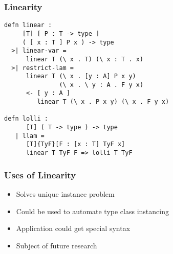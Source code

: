 \begin{frame}[fragile]
\frametitle{Linearity}
\begin{lstlisting}
defn linear : 
     [T] [ P : T -> type ] 
     ( [ x : T ] P x ) -> type
  >| linear-var = 
      linear T (\ x . T) (\ x : T . x)
  >| restrict-lam = 
      linear T (\ x . [y : A] P x y) 
               (\ x . \ y : A . F y x)
      <- [ y : A ] 
         linear T (\ x . P x y) (\ x . F y x)

defn lolli : 
      [T] ( T -> type ) -> type
   | llam = 
      [T]{TyF}[F : [x : T] TyF x]
      linear T TyF F => lolli T TyF
\end{lstlisting}
\end{frame}


\begin{frame}
\frametitle{Uses of Linearity}
\begin{itemize}
\item Solves unique instance problem
\item Could be used to automate type class instancing
\item Application could get special syntax
\item Subject of future research
\end{itemize}
\end{frame}
